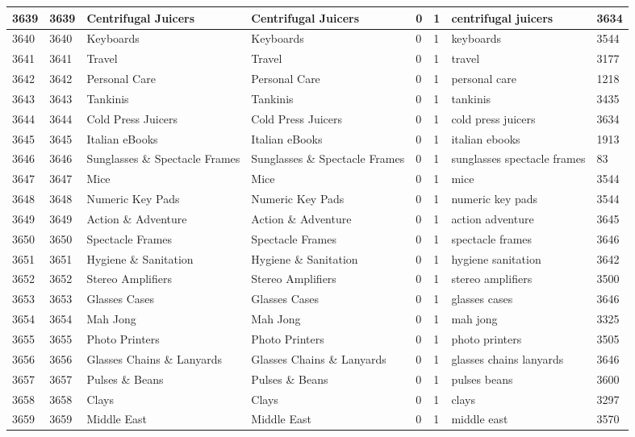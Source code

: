 \begin{longtable}{|l|l|l|l|l|l|l|l|}
3639 & 3639 & Centrifugal Juicers & Centrifugal Juicers & 0 & 1 & centrifugal juicers & 3634 \\ \hline 
3640 & 3640 & Keyboards & Keyboards & 0 & 1 & keyboards & 3544 \\ \hline 
3641 & 3641 & Travel & Travel & 0 & 1 & travel & 3177 \\ \hline 
3642 & 3642 & Personal Care & Personal Care & 0 & 1 & personal care & 1218 \\ \hline 
3643 & 3643 & Tankinis & Tankinis & 0 & 1 & tankinis & 3435 \\ \hline 
3644 & 3644 & Cold Press Juicers & Cold Press Juicers & 0 & 1 & cold press juicers & 3634 \\ \hline 
3645 & 3645 & Italian eBooks & Italian eBooks & 0 & 1 & italian ebooks & 1913 \\ \hline 
3646 & 3646 & Sunglasses \& Spectacle Frames & Sunglasses \& Spectacle Frames & 0 & 1 & sunglasses spectacle frames & 83 \\ \hline 
3647 & 3647 & Mice & Mice & 0 & 1 & mice & 3544 \\ \hline 
3648 & 3648 & Numeric Key Pads & Numeric Key Pads & 0 & 1 & numeric key pads & 3544 \\ \hline 
3649 & 3649 & Action \& Adventure & Action \& Adventure & 0 & 1 & action adventure & 3645 \\ \hline 
3650 & 3650 & Spectacle Frames & Spectacle Frames & 0 & 1 & spectacle frames & 3646 \\ \hline 
3651 & 3651 & Hygiene \& Sanitation & Hygiene \& Sanitation & 0 & 1 & hygiene sanitation & 3642 \\ \hline 
3652 & 3652 & Stereo Amplifiers & Stereo Amplifiers & 0 & 1 & stereo amplifiers & 3500 \\ \hline 
3653 & 3653 & Glasses Cases & Glasses Cases & 0 & 1 & glasses cases & 3646 \\ \hline 
3654 & 3654 & Mah Jong & Mah Jong & 0 & 1 & mah jong & 3325 \\ \hline 
3655 & 3655 & Photo Printers & Photo Printers & 0 & 1 & photo printers & 3505 \\ \hline 
3656 & 3656 & Glasses Chains \& Lanyards & Glasses Chains \& Lanyards & 0 & 1 & glasses chains lanyards & 3646 \\ \hline 
3657 & 3657 & Pulses \& Beans & Pulses \& Beans & 0 & 1 & pulses beans & 3600 \\ \hline 
3658 & 3658 & Clays & Clays & 0 & 1 & clays & 3297 \\ \hline 
3659 & 3659 & Middle East & Middle East & 0 & 1 & middle east & 3570 \\ \hline 

\end{longtable}
